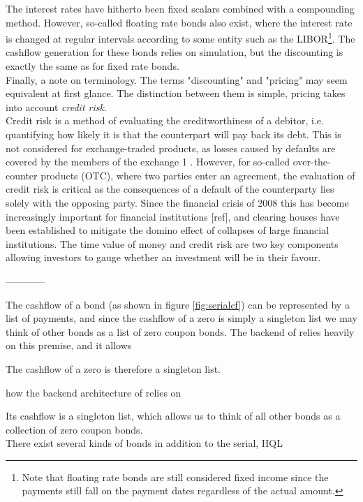 The interest rates have hitherto been fixed scalars combined with a compounding 
method. However, so-called floating rate bonds also exist, where the interest 
rate is changed at regular intervals according to some entity such as the 
LIBOR\footnote{Note that floating rate bonds are still considered fixed 
income since the payments still fall on the payment dates regardless of the 
actual amount.}. The cashflow generation for these bonds relies on simulation, 
but the discounting is exactly the same as for fixed rate bonds.\\

Finally, a note on terminology. The terms "discounting" and "pricing" 
may seem equivalent at first glance. The distinction between them is simple, 
pricing takes into account \emph{credit risk}. \\

Credit risk is a method of evaluating the creditworthiness of a debitor, i.e. 
quantifying
how likely it is that the counterpart will pay back its debt. This is not 
considered for
exchange-traded products, as losses caused by defaults are covered by the 
members of the exchange 1 . However, for so-called over-the-counter products 
(OTC), where two parties enter an agreement, the evaluation of credit risk is 
critical as the consequences of a default of the counterparty lies solely with 
the opposing party. Since the financial crisis of 2008 this has become 
increasingly important for financial institutions [ref], and clearing houses 
have been established to mitigate the domino effect of collapses of large 
financial institutions. The time value of money and credit risk are two key 
components allowing investors to gauge whether an investment will be in their 
favour.

------------

The cashflow of a bond (as shown in figure \ref{fig:serialcf}) can be 
represented by a list of payments, and since the cashflow of a zero is simply
a singleton list we may think of other bonds as a list of zero coupon bonds.
The backend of \hql relies heavily on this premise, and it allows 

The cashflow of a zero is therefore a singleton list.

how the backend
architecture of \hql relies on

Its cashflow is a singleton list, which allows us to think of all other bonds
as a collection of zero coupon bonds.\\

There exist several kinds of bonds in addition to the serial, \textsc{HQL}


